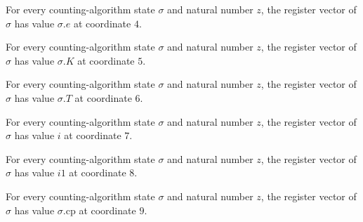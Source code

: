 \begin{lemma}
\label{Complexity.LogProg.ISCount.St.toV_e}
\leanok
{}
For every counting-algorithm state $\sigma$ and natural number $z$, the register vector
of $\sigma$ has value $\sigma.e$ at coordinate $4$.
\end{lemma}

\begin{lemma}
\label{Complexity.LogProg.ISCount.St.toV_K}
\leanok
{}
For every counting-algorithm state $\sigma$ and natural number $z$, the register vector
of $\sigma$ has value $\sigma.K$ at coordinate $5$.
\end{lemma}

\begin{lemma}
\label{Complexity.LogProg.ISCount.St.toV_T}
\leanok
{}
For every counting-algorithm state $\sigma$ and natural number $z$, the register vector
of $\sigma$ has value $\sigma.T$ at coordinate $6$.
\end{lemma}

\begin{lemma}
\label{Complexity.LogProg.ISCount.St.toV_i}
\leanok
{}
For every counting-algorithm state $\sigma$ and natural number $z$, the register vector
of $\sigma$ has value $i$ at coordinate $7$.
\end{lemma}

\begin{lemma}
\label{Complexity.LogProg.ISCount.St.toV_i1}
\leanok
{}
For every counting-algorithm state $\sigma$ and natural number $z$, the register vector
of $\sigma$ has value $i1$ at coordinate $8$.
\end{lemma}

\begin{lemma}
\label{Complexity.LogProg.ISCount.St.toV_cp}
\leanok
{}
For every counting-algorithm state $\sigma$ and natural number $z$, the register vector
of $\sigma$ has value $\sigma.\mathrm{cp}$ at coordinate $9$.
\end{lemma}


